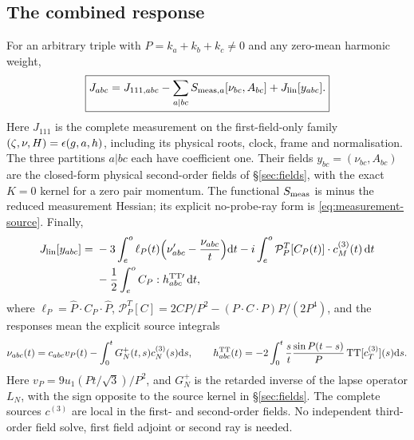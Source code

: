 \subsection{The combined response}\label{sec:combined}
\begin{proposition}\label{prop:combined}
For an arbitrary triple with $P=k_a+k_b+k_c\neq0$ and any zero-mean harmonic weight,
\begin{equation}\label{eq:combined}
\boxed{J_{abc}=J_{111,abc}-\sum_{a|bc}S_{{\rm meas},a}[\nu_{bc},A_{bc}]+J_{\rm lin}[y_{abc}].}
\end{equation}
Here $J_{111}$ is the complete measurement on the first-field-only family
$(\zeta,\nu,H)=\epsilon(g,a,h)$, including its physical roots, clock, frame and normalisation.
The three partitions $a|bc$ each have coefficient one. Their fields
$y_{bc}=(\nu_{bc},A_{bc})$ are the closed-form physical second-order fields of
\S\ref{sec:fields}, with the exact $K=0$ kernel for a zero pair momentum.
The functional $S_{\rm meas}$ is minus the reduced measurement Hessian; its explicit
no-probe-ray form is \eqref{eq:measurement-source}. Finally,
\begin{equation}\label{eq:combined-linear}
\begin{split}
 J_{\rm lin}[y_{abc}]={}&-3\int_e^o\ell_P(t)\Big(\nu_{abc}'-\frac{\nu_{abc}}t\Big)\mathrm{d} t
 -i\int_e^o\mathcal P_P^T[C_P(t)]\cdot c^{(3)}_M(t)\,\mathrm{d} t\\
 &-\frac12\int_e^o C_P:h^{{\rm TT}\prime}_{abc}\,\mathrm{d} t,
\end{split}
\end{equation}
where $\ell_P=\hat P\cdot C_P\cdot\hat P$,
$\mathcal P_P^T[C]=2CP/P^2-(P\cdot C\cdot P)P/(2P^4)$, and the responses mean the
explicit source integrals
\[
 \nu_{abc}(t)=c_{abc}v_P(t)-\int_0^tG_N^+(t,s)c_N^{(3)}(s)\mathrm{d} s,\qquad
 h^{\rm TT}_{abc}(t)=-2\int_0^t\frac{s}{t}\frac{\sin P(t-s)}P\,
 \mathrm{TT}[c_T^{(3)}](s)\mathrm{d} s.
\]
Here $v_P=9u_1(Pt/\sqrt3)/P^2$, and $G_N^+$ is the retarded inverse of the lapse
operator $L_N$, with the sign opposite to the source kernel in \S\ref{sec:fields}.
The complete sources $c^{(3)}$ are local in the first- and second-order fields.
No independent third-order field solve, first field adjoint or second ray is needed.
\end{proposition}
